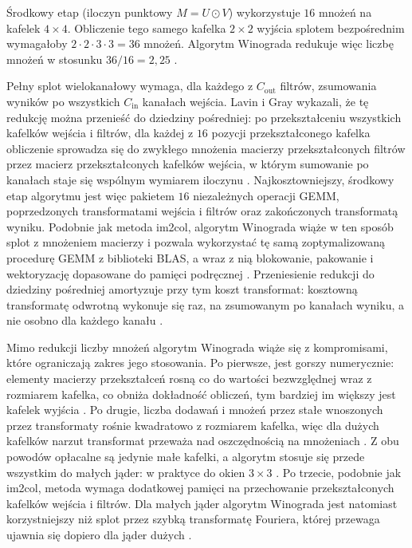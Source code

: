 \documentclass[a4paper,12pt]{book} %
\begin{document}
Środkowy etap (iloczyn punktowy $M = U \odot V$) wykorzystuje $16$ mnożeń na kafelek $4 \times 4$. Obliczenie tego samego kafelka $2 \times 2$ wyjścia splotem bezpośrednim wymagałoby $2 \cdot 2 \cdot 3 \cdot 3 = 36$ mnożeń. Algorytm Winograda redukuje więc liczbę mnożeń w stosunku $36/16 = 2{,}25$ \cite{lavin2016fast}.

Pełny splot wielokanałowy wymaga, dla każdego z $C_{\mathrm{out}}$ filtrów, zsumowania wyników po wszystkich $C_{\mathrm{in}}$ kanałach wejścia. Lavin i Gray wykazali, że tę redukcję można przenieść do dziedziny pośredniej: po przekształceniu wszystkich kafelków wejścia i filtrów, dla każdej z $16$ pozycji przekształconego kafelka obliczenie sprowadza się do zwykłego mnożenia macierzy przekształconych filtrów przez macierz przekształconych kafelków wejścia, w którym sumowanie po kanałach staje się wspólnym wymiarem iloczynu \cite{lavin2016fast}. Najkosztowniejszy, środkowy etap algorytmu jest więc pakietem $16$ niezależnych operacji GEMM, poprzedzonych transformatami wejścia i filtrów oraz zakończonych transformatą wyniku. Podobnie jak metoda im2col, algorytm Winograda wiąże w ten sposób splot z mnożeniem macierzy i pozwala wykorzystać tę samą zoptymalizowaną procedurę GEMM z biblioteki BLAS, a wraz z nią blokowanie, pakowanie i wektoryzację dopasowane do pamięci podręcznej \cite{lavin2016fast}. Przeniesienie redukcji do dziedziny pośredniej amortyzuje przy tym koszt transformat: kosztowną transformatę odwrotną wykonuje się raz, na zsumowanym po kanałach wyniku, a nie osobno dla każdego kanału \cite{lavin2016fast}.

Mimo redukcji liczby mnożeń algorytm Winograda wiąże się z kompromisami, które ograniczają zakres jego stosowania. Po pierwsze, jest gorszy numerycznie: elementy macierzy przekształceń rosną co do wartości bezwzględnej wraz z rozmiarem kafelka, co obniża dokładność obliczeń, tym bardziej im większy jest kafelek wyjścia \cite{lavin2016fast}. Po drugie, liczba dodawań i mnożeń przez stałe wnoszonych przez transformaty rośnie kwadratowo z rozmiarem kafelka, więc dla dużych kafelków narzut transformat przeważa nad oszczędnością na mnożeniach \cite{lavin2016fast}. Z obu powodów opłacalne są jedynie małe kafelki, a algorytm stosuje się przede wszystkim do małych jąder: w praktyce do okien $3 \times 3$ \cite{lavin2016fast}. Po trzecie, podobnie jak im2col, metoda wymaga dodatkowej pamięci na przechowanie przekształconych kafelków wejścia i filtrów. Dla małych jąder algorytm Winograda jest natomiast korzystniejszy niż splot przez szybką transformatę Fouriera, której przewaga ujawnia się dopiero dla jąder dużych \cite{lavin2016fast}.
\end{document}
